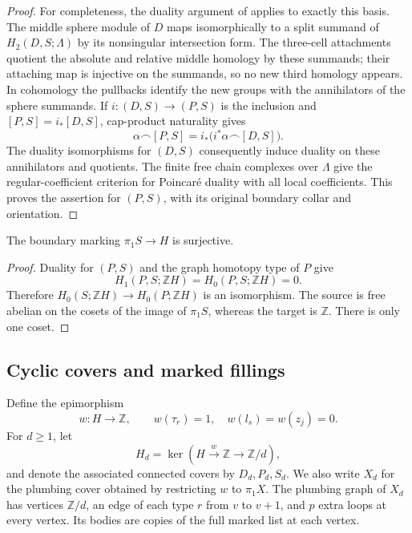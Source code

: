 \begin{proof}
For completeness, the duality argument of \cite[Section~2.3]{PD}
applies to exactly this basis.  The middle sphere module of
$D$ maps isomorphically to a split summand of
$H_2(D,S;\Lambda)$ by its nonsingular intersection form.
The three-cell attachments quotient the absolute and relative
middle homology by these summands; their attaching map is
injective on the summands, so no new third homology appears.
In cohomology the pullbacks identify the new groups with the
annihilators of the sphere summands.  If $i:(D,S)\to(P,S)$ is
the inclusion and $[P,S]=i_*[D,S]$, cap-product naturality
gives
\[
 \alpha\frown[P,S]
   =i_*\bigl(i^*\alpha\frown[D,S]\bigr).
\]
The duality isomorphisms for $(D,S)$ consequently induce
duality on these annihilators and quotients.  The finite
free chain complexes over $\Lambda$ give the regular-coefficient
criterion for Poincar\'e duality with all local coefficients.
This proves the assertion for $(P,S)$, with its original
boundary collar and orientation.
\end{proof}

\begin{corollary}
\label{ch:boundary-surjectivity}
The boundary marking $\pi_1S\to H$ is surjective.
\end{corollary}

\begin{proof}
Duality for $(P,S)$ and the graph homotopy type of $P$ give
\[
 H_1(P,S;\mathbb ZH)=H_0(P,S;\mathbb ZH)=0.
\]
Therefore
$H_0(S;\mathbb ZH)\to H_0(P;\mathbb ZH)$ is an isomorphism.
The source is free abelian on the cosets of the image of
$\pi_1S$, whereas the target is $\mathbb Z$.  There is only
one coset.
\end{proof}

\subsection{Cyclic covers and marked fillings}
\label{ch:cyclic-covers}

Define the epimorphism
\begin{equation}
\label{ch:cover-character}
 w:H\longrightarrow\mathbb Z,\qquad
 w(\tau_r)=1,\quad w(l_s)=w(z_j)=0.
\end{equation}
For $d\geq1$, let
\[
 H_d=\ker(H\xrightarrow{w}\mathbb Z\longrightarrow\mathbb Z/d),
\]
and denote the associated connected covers by $D_d,P_d,S_d$.
We also write $X_d$ for the plumbing cover obtained by restricting
$w$ to $\pi_1X$.  The plumbing graph of $X_d$ has vertices
$\mathbb Z/d$, an edge of each type $r$ from $v$ to $v+1$,
and $p$ extra loops at every vertex.  Its bodies are copies of
the full marked list at each vertex.

